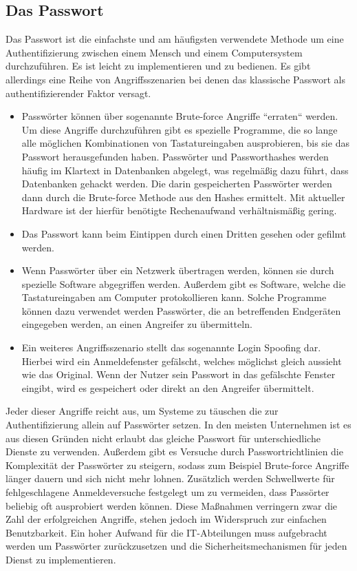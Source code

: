 \documentclass[
book,
a4paper,   
titlepage,  
halfparskip,
12pt        
]{scrartcl}
\begin{document}
\begin{onehalfspacing}
\subsection{Das Passwort}
\label{subsec:pass}
Das Passwort ist die einfachste und am häufigsten verwendete Methode um eine Authentifizierung zwischen einem Mensch und einem Computersystem durchzuführen. Es ist leicht zu implementieren und zu bedienen. Es gibt allerdings eine Reihe von Angriffsszenarien bei denen das klassische Passwort als authentifizierender Faktor versagt.
\begin{itemize}
	\item Passwörter können über sogenannte Brute-force Angriffe ``erraten`` werden. Um diese Angriffe durchzuführen gibt es spezielle Programme, die so lange alle möglichen Kombinationen von Tastatureingaben ausprobieren, bis sie das Passwort herausgefunden haben. Passwörter und Passworthashes werden häufig im Klartext in Datenbanken abgelegt, was regelmäßig dazu führt, dass Datenbanken gehackt werden. Die darin gespeicherten Passwörter werden dann durch die Brute-force Methode aus den Hashes ermittelt. Mit aktueller Hardware ist der hierfür benötigte Rechenaufwand verhältnismäßig gering.\cite{brute}  
	\item Das Passwort kann beim Eintippen durch einen Dritten gesehen oder gefilmt werden. 
	\item Wenn Passwörter über ein Netzwerk übertragen werden, können sie durch spezielle Software abgegriffen werden. Außerdem gibt es Software, welche die Tastatureingaben am Computer protokollieren kann. Solche Programme können dazu verwendet werden Passwörter, die an betreffenden Endgeräten eingegeben werden, an einen Angreifer zu übermitteln.\cite{key}
	\item Ein weiteres Angriffsszenario stellt das sogenannte Login Spoofing dar. Hierbei wird ein Anmeldefenster gefälscht, welches möglichst gleich aussieht wie das Original. Wenn der Nutzer sein Passwort in das gefälschte Fenster eingibt, wird es gespeichert oder direkt an den Angreifer übermittelt.\cite{spoofing}
\end{itemize}
Jeder dieser Angriffe reicht aus, um Systeme zu täuschen die zur Authentifizierung allein auf Passwörter setzen. In den meisten Unternehmen ist es aus diesen Gründen nicht erlaubt das gleiche Passwort für unterschiedliche Dienste zu verwenden. Außerdem gibt es Versuche durch Passwortrichtlinien die Komplexität der Passwörter zu steigern, sodass zum Beispiel Brute-force Angriffe länger dauern und sich nicht mehr lohnen. Zusätzlich werden Schwellwerte für fehlgeschlagene Anmeldeversuche festgelegt um zu vermeiden, dass Passörter beliebig oft ausprobiert werden können. Diese Maßnahmen verringern zwar die Zahl der erfolgreichen Angriffe, stehen jedoch im Widerspruch zur einfachen Benutzbarkeit. Ein hoher Aufwand für die \ac{IT}-Abteilungen muss aufgebracht werden um Passwörter zurückzusetzen und die Sicherheitsmechanismen für jeden Dienst zu implementieren.\cite[S. 3ff]{hong}\\

\end{onehalfspacing}
\end{document}
